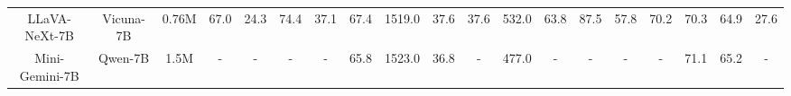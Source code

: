 \begin{table*}[ht]
{\begin{tabular}{ccc|cccccccccccccccc}
        LLaVA-NeXt-7B & \hspace{-0.9em}Vicuna-7B & \hspace{-0.9em}0.76M & \hspace{-0.5em}67.0 & \hspace{-0.9em}24.3 & \hspace{-0.9em}74.4 & \hspace{-0.9em}37.1 & \hspace{-0.9em}67.4 & \hspace{-0.9em}1519.0 & \hspace{-0.9em}37.6 & \hspace{-0.9em}37.6 & \hspace{-0.9em}532.0 & \hspace{-0.9em}63.8 & \hspace{-0.9em}87.5 & \hspace{-0.9em}57.8 & \hspace{-0.9em}70.2 & \hspace{-0.9em}70.3 & \hspace{-0.9em}64.9 & \hspace{-0.9em}27.6 \\ 
        Mini-Gemini-7B & \hspace{-0.9em}Qwen-7B & \hspace{-0.9em}1.5M & \hspace{-0.5em}- & \hspace{-0.9em}- & \hspace{-0.9em}- & \hspace{-0.9em}- & \hspace{-0.9em}65.8 & \hspace{-0.9em}1523.0 & \hspace{-0.9em}36.8 & \hspace{-0.9em}- & \hspace{-0.9em}477.0 & \hspace{-0.9em}- & \hspace{-0.9em}- & \hspace{-0.9em}- & \hspace{-0.9em}- & \hspace{-0.9em}71.1 & \hspace{-0.9em}65.2 & \hspace{-0.9em}- \\ 

\end{tabular}}
\end{table*}
